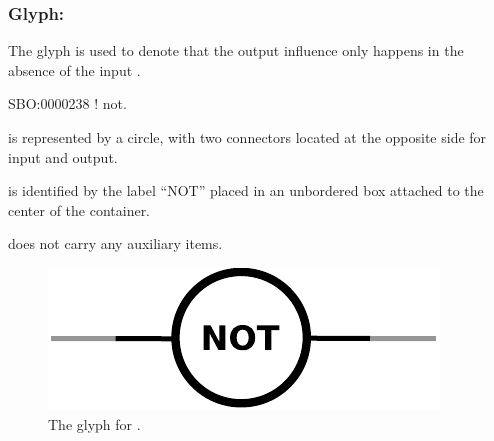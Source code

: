 \subsubsection{Glyph: }\label{sec:not}

The glyph  is used to denote that the output influence only happens in the absence of the input .

\begin{glyphDescription}

 \glyphSboTerm SBO:0000238 ! not.

 \glyphContainer {} is represented by a circle, with two connectors located at the opposite side for input and output.

  \glyphLabel {} is identified by the label ``NOT'' placed in an unbordered box attached to the center of the container. 

  \glyphAux {} does not carry any auxiliary items.

\end{glyphDescription}

\begin{figure}[H]
  \centering
  \includegraphics[scale = 0.5]{images/not}
  \caption{The \ER glyph for .}
  \label{fig:not}
\end{figure}

